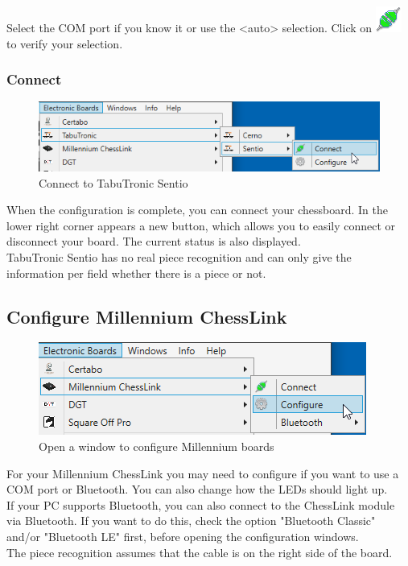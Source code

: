 \documentclass[11pt,a4paper]{article}
\begin{document}
Select the COM port if you know it or use the <auto> selection. 
Click on \includegraphics[scale=0.5]{connect.png} to verify your selection.

\subsubsection{Connect}
\begin{figure}[H]
	\centering
	\includegraphics[scale=0.8]{Sentio3.png}
	\caption{Connect to TabuTronic Sentio}
	\label{fig:Sentio3}
\end{figure}
When the configuration is complete, you can connect your chessboard.
In the lower right corner appears a new button, which allows you to easily connect or disconnect your board. The current status is also displayed.
\\TabuTronic Sentio has no real piece recognition and can only give the information per field whether there is a piece or not.


\subsection{Configure Millennium ChessLink} \label{ConfigureChessLink}
\begin{figure}[H]
	\centering
	\includegraphics[scale=1.0]{MillenniumChessLink1.png}
	\caption{Open a window to configure Millennium boards }
	\label{fig:MillenniumChessLink1}
\end{figure}

For your Millennium ChessLink you may need to configure if you want to use a COM port or Bluetooth. You can also change how the LEDs should light up.\\
If your PC supports Bluetooth, you can also connect to the ChessLink module via Bluetooth. If you want to do this, check the option "Bluetooth Classic" and/or "Bluetooth LE" first, before opening the configuration windows.\\
The piece recognition assumes that the cable is on the right side of the board.
\end{document}
